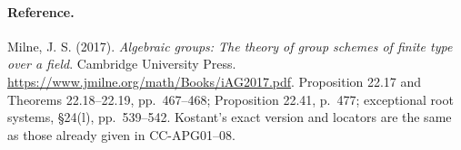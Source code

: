 \paragraph{Reference.}
Milne, J. S. (2017). \emph{Algebraic groups: The theory of group
schemes of finite type over a field}. Cambridge University Press.
\url{https://www.jmilne.org/math/Books/iAG2017.pdf}.
Proposition 22.17 and Theorems 22.18--22.19, pp.~467--468;
Proposition 22.41, p.~477; exceptional root systems,
\S24(l), pp.~539--542.  Kostant's exact version and locators
are the same as those already given in CC-APG01--08.

